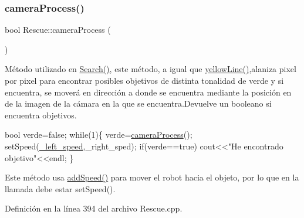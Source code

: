 \subsubsection{\texorpdfstring{camera\+Process()}{cameraProcess()}}
{\footnotesize\ttfamily bool Rescue\+::camera\+Process (\begin{DoxyParamCaption}{ }\end{DoxyParamCaption})}



Método utilizado en \hyperlink{classRescue_a3ea9a01b97d0291afa704bff73564938_a3ea9a01b97d0291afa704bff73564938}{Search()}, este método, a igual que \hyperlink{classRescue_ab1ea1e98e62403dc681f26529805fe2a_ab1ea1e98e62403dc681f26529805fe2a}{yellow\+Line()},alaniza pixel por pixel para encontrar posibles objetivos de distinta tonalidad de verde y si encuentra, se moverá en dirección a donde se encuentra mediante la posición en de la imagen de la cámara en la que se encuentra.\+Devuelve un booleano si encuentra objetivos. 


\begin{DoxyCode}
\textcolor{keywordtype}{bool} verde=\textcolor{keyword}{false};
\textcolor{keywordflow}{while}(1)\{
  verde=\hyperlink{classRescue_a8fca4fbd58ec9ccab6fc88424b16723f_a8fca4fbd58ec9ccab6fc88424b16723f}{cameraProcess}();
  setSpeed(\hyperlink{classRescue_a29d594459f17968e6db993605d239c47_a29d594459f17968e6db993605d239c47}{\_left\_speed},\_right\_sped);
  \textcolor{keywordflow}{if}(verde==\textcolor{keyword}{true}) cout<<\textcolor{stringliteral}{"He encontrado objetivo"}<<endl;
\}
\end{DoxyCode}
 Este método usa \hyperlink{classRescue_a9a430924f65d71eca4e02dc9b2704947_a9a430924f65d71eca4e02dc9b2704947}{add\+Speed()} para mover el robot hacia el objeto, por lo que en la llamada debe estar set\+Speed(). 

Definición en la línea 394 del archivo Rescue.\+cpp.


